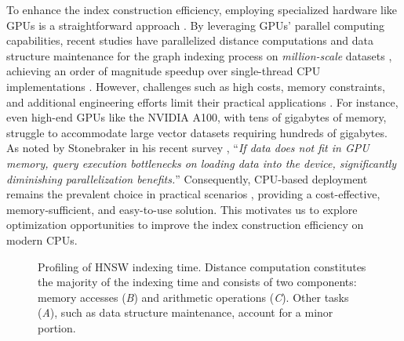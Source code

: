 To enhance the index construction efficiency, employing specialized hardware like GPUs is a straightforward approach \cite{WangZZY21,ShiZZJHLH18}. 
By leveraging GPUs' parallel computing capabilities, recent studies have parallelized distance computations and data structure maintenance for the graph indexing process on \textit{million-scale} datasets \cite{GANNS,CAGRA,SONG}, achieving an order of magnitude speedup over single-thread CPU implementations \cite{GANNS}. 
However, challenges such as high costs, memory constraints, and additional engineering efforts limit their practical applications \cite{ZhangL0L024}. 
For instance, even high-end GPUs like the NVIDIA A100, with tens of gigabytes of memory, struggle to accommodate large vector datasets requiring hundreds of gigabytes. 
As noted by Stonebraker in his recent survey \cite{Stonebraker_SIGMOD_Record}, ``\textit{If data does not fit in GPU memory, query execution bottlenecks on loading data into the device, significantly diminishing parallelization benefits.}'' Consequently, CPU-based deployment remains the prevalent choice in practical scenarios \cite{Milvus_sigmod2021,ColemanSSS22,douze2024faiss,PASE}, providing a cost-effective, memory-sufficient, and easy-to-use solution. 
This motivates us to explore optimization opportunities to improve the index construction efficiency on modern CPUs.

\begin{figure}
  \setlength{\abovecaptionskip}{0cm}
  \setlength{\belowcaptionskip}{-0.4cm}
  \centering
  \footnotesize
  \hspace{0.15cm}
  \newline
  \caption{Profiling of HNSW indexing time. Distance computation constitutes the majority of the indexing time and consists of two components: memory accesses (\textit{B}) and arithmetic operations (\textit{C}). Other tasks (\textit{A}), such as data structure maintenance, account for a minor portion.}
  \label{fig: indexing profile}
  \vspace{-0.4cm}
\end{figure}

